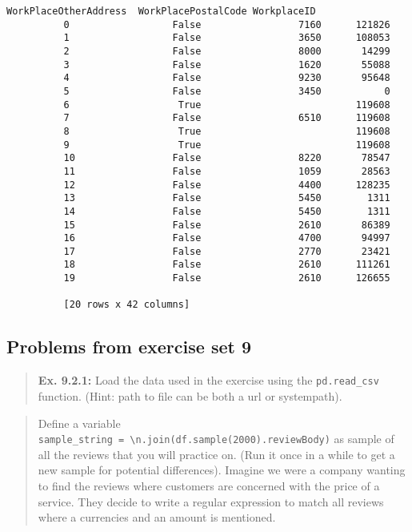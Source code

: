 \documentclass[11pt]{article}
\begin{document}
\begin{Verbatim}[commandchars=\\\{\}]
             WorkPlaceOtherAddress  WorkPlacePostalCode WorkplaceID  
          0                  False                 7160      121826  
          1                  False                 3650      108053  
          2                  False                 8000       14299  
          3                  False                 1620       55088  
          4                  False                 9230       95648  
          5                  False                 3450           0  
          6                   True                           119608  
          7                  False                 6510      119608  
          8                   True                           119608  
          9                   True                           119608  
          10                 False                 8220       78547  
          11                 False                 1059       28563  
          12                 False                 4400      128235  
          13                 False                 5450        1311  
          14                 False                 5450        1311  
          15                 False                 2610       86389  
          16                 False                 4700       94997  
          17                 False                 2770       23421  
          18                 False                 2610      111261  
          19                 False                 2610      126655  
          
          [20 rows x 42 columns]
\end{Verbatim}
            
    \subsection{Problems from exercise set
9}\label{problems-from-exercise-set-9}

\begin{quote}
\textbf{Ex. 9.2.1:} Load the data used in the exercise using the
\texttt{pd.read\_csv} function. (Hint: path to file can be both a url or
systempath).
\end{quote}

\begin{quote}
Define a variable
\texttt{sample\_string\ =\ \textquotesingle{}\textbackslash{}n\textquotesingle{}.join(df.sample(2000).reviewBody)}
as sample of all the reviews that you will practice on. (Run it once in
a while to get a new sample for potential differences). Imagine we were
a company wanting to find the reviews where customers are concerned with
the price of a service. They decide to write a regular expression to
match all reviews where a currencies and an amount is mentioned.
\end{quote}
\end{document}
